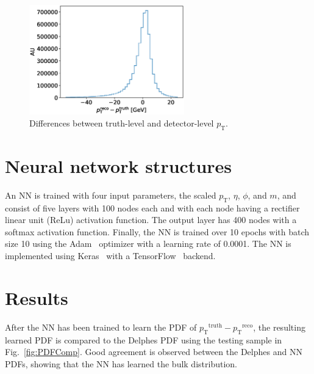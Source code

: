 \documentclass[showpacs,showkeys,preprint,prd,nofootinbib,linenumbers,12pt]{revtex4-1}
\def\pt{\ensuremath{p_{\mathrm{T}}}}
\def\ptRes{\ensuremath{\pt^{\mathrm{truth}}-\pt^{\mathrm{reco}}}}
\begin{document}
\begin{figure}[h]
  \includegraphics[width=0.6\textwidth]{figures/nn/pTRes_nobounds_prescaling.eps}
  \caption{Differences between truth-level and detector-level \pt.}
  \label{fig:deltaTarget}
\end{figure}

\section{Neural network structures}

An NN is trained with four input parameters, the scaled \pt, $\eta$, $\phi$, and $m$, and consist of five layers with 100 nodes each and with each node having a rectifier linear unit (ReLu) activation function. The output layer has 400 nodes with a softmax activation function. Finally, the NN is trained over 10 epochs with batch size 10 using the Adam~\cite{adam} optimizer with a learning rate of 0.0001. The NN is implemented using Keras~\cite{chollet2015keras} with a TensorFlow~\cite{tensorflow2015-whitepaper} backend.

\section{Results}

After the NN has been trained to learn the PDF of \ptRes, the resulting learned PDF is compared to the Delphes PDF using the testing sample in Fig.~\ref{fig:PDFComp}. Good agreement is observed between the Delphes and NN PDFs, showing that the NN has learned the bulk distribution.
\end{document}
